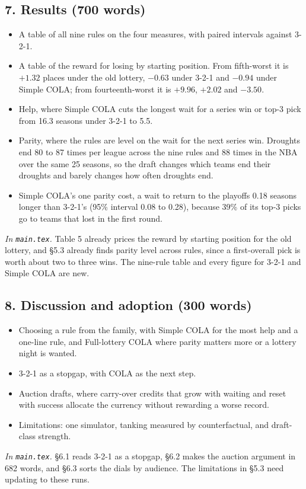 \documentclass[10pt]{article}
\newcommand{\inmain}[1]{\textit{In \texttt{main.tex}.} #1\par}
\begin{document}
\subsection{7. Results (700 words)}
\begin{itemize}
\item A table of all nine rules on the four measures, with paired intervals against 3-2-1.
\item A table of the reward for losing by starting position. From fifth-worst it is $+1.32$ places under the old lottery, $-0.63$ under 3-2-1 and $-0.94$ under Simple COLA; from fourteenth-worst it is $+9.96$, $+2.02$ and $-3.50$.
\item Help, where Simple COLA cuts the longest wait for a series win or top-3 pick from 16.3 seasons under 3-2-1 to 5.5.
\item Parity, where the rules are level on the wait for the next series win. Droughts end 80 to 87 times per league across the nine rules and 88 times in the NBA over the same 25 seasons, so the draft changes which teams end their droughts and barely changes how often droughts end.
\item Simple COLA's one parity cost, a wait to return to the playoffs 0.18 seasons longer than 3-2-1's (95\% interval 0.08 to 0.28), because 39\% of its top-3 picks go to teams that lost in the first round.
\end{itemize}
\inmain{Table 5 already prices the reward by starting position for the old lottery, and \S5.3 already finds parity level across rules, since a first-overall pick is worth about two to three wins. The nine-rule table and every figure for 3-2-1 and Simple COLA are new.}

\subsection{8. Discussion and adoption (300 words)}
\begin{itemize}
\item Choosing a rule from the family, with Simple COLA for the most help and a one-line rule, and Full-lottery COLA where parity matters more or a lottery night is wanted.
\item 3-2-1 as a stopgap, with COLA as the next step.
\item Auction drafts, where carry-over credits that grow with waiting and reset with success allocate the currency without rewarding a worse record.
\item Limitations: one simulator, tanking measured by counterfactual, and draft-class strength.
\end{itemize}
\inmain{\S6.1 reads 3-2-1 as a stopgap, \S6.2 makes the auction argument in 682 words, and \S6.3 sorts the dials by audience. The limitations in \S5.3 need updating to these runs.}
\end{document}

